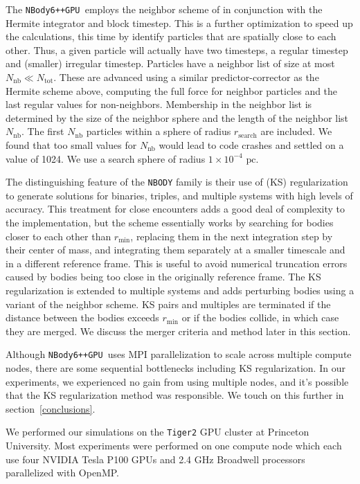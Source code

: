 \documentclass[preprint1]{aastex}
\newcommand\pc{\mbox{ pc}}
\newcommand\nbody{\texttt{NBody6++GPU }}
\numberwithin{equation}{section}
\begin{document}
The \nbody employs the neighbor scheme of \citet{1973Ahmad} in conjunction with the Hermite integrator and block timestep. This is a further optimization to speed up the calculations, this time by identify particles that are spatially close to each other. Thus, a given particle will actually have two timesteps, a regular timestep and (smaller) irregular timestep. Particles have a neighbor list of size at most $N_{\mathrm{nb}} \ll N_{\mathrm{tot}}$.  These are advanced using a similar predictor-corrector as the Hermite scheme above, computing the full force for neighbor particles and the last regular values for non-neighbors. Membership in the neighbor list is determined by the size of the neighbor sphere and the length of the neighbor list $N_{\mathrm{nb}}$.  The first $N_{\mathrm{nb}}$ particles within a sphere of radius $r_{\mathrm{search}}$ are included.  We found that too small values for $N_{\mathrm{nb}}$ would lead to code crashes and settled on a value of 1024.  We use a search sphere of radius $1 \times 10^{-4} \pc$.

The distinguishing feature of the \texttt{NBODY} family is their use of \citet{1965Kusta} (KS) regularization to generate solutions for binaries, triples, and multiple systems with high levels of accuracy.  This treatment for close encounters adds a good deal of complexity to the implementation, but the scheme essentially works by searching for bodies closer to each other than $r_{\mathrm{min}}$, replacing them in the next integration step by their center of mass, and integrating them separately at a smaller timescale and in a different reference frame. This is useful to avoid numerical truncation errors caused by bodies being too close in the originally reference frame. The KS regularization is extended to multiple systems and adds perturbing bodies using a variant of the \citet{1973Ahmad} neighbor scheme. KS pairs and multiples are terminated if the distance between the bodies exceeds $r_{\mathrm{min}}$ or if the bodies collide, in which case they are merged.  We discuss the merger criteria and method later in this section.

Although \nbody uses MPI parallelization to scale across multiple compute nodes, there are some sequential bottlenecks including KS regularization. In our experiments, we experienced no gain from using multiple nodes, and it's possible that the KS regularization method was responsible. We touch on this further in section~\ref{conclusions}.

We performed our simulations on the \texttt{Tiger2} GPU cluster at Princeton University. Most experiments were performed on one compute node which each use four NVIDIA Tesla P100 GPUs and 2.4 GHz Broadwell processors parallelized with OpenMP.
\end{document}
